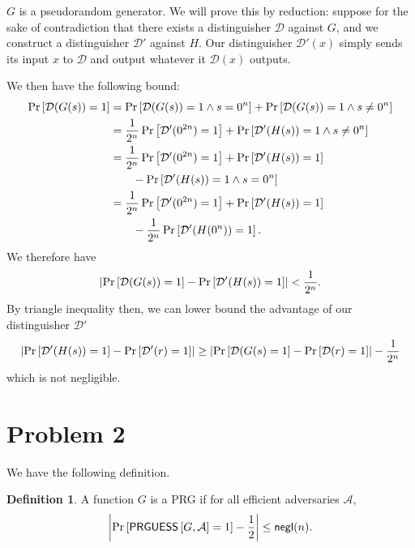 \documentclass{article}
\theoremstyle{definition}
\newtheorem{definition}{Definition}
\begin{document}
$G$ is a pseudorandom generator.
We will prove this by reduction:
suppose for the sake of contradiction that there exists a distinguisher $\mathcal{D}$ against $G$, and we construct a distinguisher $\mathcal{D}'$ against $H$.
Our distinguisher $\mathcal{D}'(x)$ simply sends its input $x$ to $\mathcal{D}$ and output whatever it $\mathcal{D}(x)$ outputs.

We then have the following bound:
\begin{align*}
   \Pr\left[\mathcal{D}(G(s))=1\right] &= \Pr\left[\mathcal{D}(G(s))=1\wedge s=0^n\right]+\Pr\left[\mathcal{D}(G(s))=1\wedge s\ne0^n\right] \\
   &= \frac{1}{2^n} \Pr\left[\mathcal{D}'(0^{2n})=1\right] + \Pr\left[\mathcal{D}'(H(s))=1\wedge s\ne 0^n\right] \\
   &= \frac{1}{2^n} \Pr\left[\mathcal{D}'(0^{2n})=1\right] + \Pr\left[\mathcal{D}'(H(s))=1\right]
   \\
   &\qquad - \Pr\left[\mathcal{D}'(H(s))=1 \wedge s=0^n\right] \\
   &= \frac{1}{2^n} \Pr\left[\mathcal{D}'(0^{2n})=1\right] + \Pr\left[\mathcal{D}'(H(s))=1\right] \\
   &\qquad - \frac{1}{2^n}\Pr\left[\mathcal{D}'(H(0^n))=1\right].
\end{align*}
We therefore have
\begin{equation*}
    \abs{\Pr\left[\mathcal{D}(G(s))=1\right] - \Pr\left[\mathcal{D}'(H(s))=1\right]} < \frac{1}{2^n}.
\end{equation*}
By triangle inequality then, we can lower bound the advantage of our distinguisher $\mathcal{D}'$
\begin{align*}
    \abs{\Pr\left[\mathcal{D}'(H(s))=1\right] - \Pr\left[\mathcal{D}'(r)=1\right]} \geq \abs{\Pr\left[\mathcal{D}(G(s)=1\right] - \Pr\left[\mathcal{D}(r)=1\right]} - \frac{1}{2^n}
\end{align*}
which is not negligible.

\section*{Problem 2}

We have the following definition.
\begin{definition}
    \label{def:prg}
    A function $G$ is a PRG if for all efficient adversaries $\mathcal{A}$,
$$\abs{\Pr\left[\mathsf{PRGUESS}\left[G, \mathcal{A}\right] = 1\right]-\frac{1}{2}}\leq \mathsf{negl}(n).$$
\end{definition}
\end{document}
